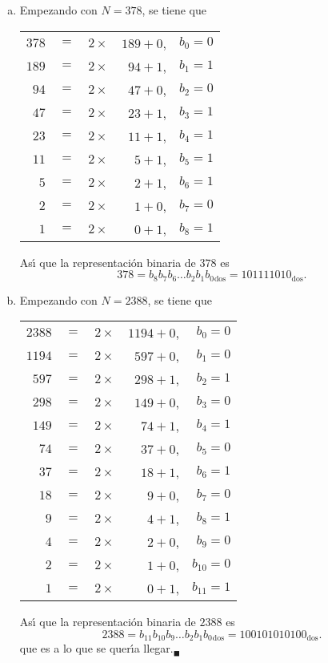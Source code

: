 \begin{solucion}
\begin{enumerate}[(a)]
  \item Empezando con $N=378$, se tiene que
  \begin{center}
   \begin{tabular}{rclrr}
    $378$ & $=$ & $2\times$ & $189+0$, & $b_0 = 0$ \\
    $189$ & $=$ & $2\times$ & $94 +1$, & $b_1 = 1$ \\
    $94$  & $=$ & $2\times$ & $47 +0$, & $b_2 = 0$ \\
    $47$  & $=$ & $2\times$ & $23 +1$, & $b_3 = 1$ \\
    $23$  & $=$ & $2\times$ & $11 +1$, & $b_4 = 1$ \\
    $11$  & $=$ & $2\times$ & $5  +1$, & $b_5 = 1$ \\
    $5$   & $=$ & $2\times$ & $2  +1$, & $b_6 = 1$ \\
    $2$   & $=$ & $2\times$ & $1  +0$, & $b_7 = 0$ \\
    $1$   & $=$ & $2\times$ & $0  +1$, & $b_8 = 1$
   \end{tabular}
  \end{center}
  As\'{\i} que la representaci\'on binaria de $378$ es
  \begin{equation*}
   378 = b_8 b_7 b_6 \ldots b_2b_1b_{0}{}_{\text{dos}} = 101111010_{\text{dos}}.
  \end{equation*}

  \item Empezando con $N=2388$, se tiene que
  \begin{center}
   \begin{tabular}{rclrr}
    $2388$ & $=$ & $2\times$ & $1194+0$, & $b_0    = 0$ \\
    $1194$ & $=$ & $2\times$ & $597 +0$, & $b_1    = 0$ \\
    $597$  & $=$ & $2\times$ & $298 +1$, & $b_2    = 1$ \\
    $298$  & $=$ & $2\times$ & $149 +0$, & $b_3    = 0$ \\
    $149$  & $=$ & $2\times$ & $74  +1$, & $b_4    = 1$ \\
    $74$   & $=$ & $2\times$ & $37  +0$, & $b_5    = 0$ \\
    $37$   & $=$ & $2\times$ & $18  +1$, & $b_6    = 1$ \\
    $18$   & $=$ & $2\times$ & $9   +0$, & $b_7    = 0$ \\
    $9$    & $=$ & $2\times$ & $4   +1$, & $b_8    = 1$ \\
    $4$    & $=$ & $2\times$ & $2   +0$, & $b_9    = 0$ \\
    $2$    & $=$ & $2\times$ & $1   +0$, & $b_{10} = 0$ \\
    $1$    & $=$ & $2\times$ & $0   +1$, & $b_{11} = 1$
   \end{tabular}
  \end{center}
  As\'{\i} que la representaci\'on binaria de $2388$ es
  \begin{equation*}
   2388 = b_{11} b_{10} b_9 \ldots b_2b_1b_0{}_{\text{dos}} = 100101010100_{\text{dos}}.
  \end{equation*}
  que es a lo que se quer\'{\i}a llegar.${}_{\blacksquare}$
 \end{enumerate}
\end{solucion}
